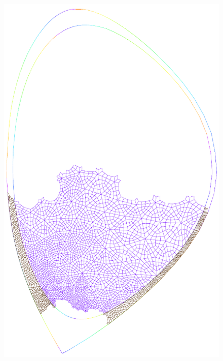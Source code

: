 \begin{figure}
{\includegraphics[scale=.5]{images/tokamak_layer_mesh_adapt_fine_2_par.pdf}}\quad
\subfigure[{rank = 3}\label{fig:tokamak_layer_mesh_adapt_fine_3_par}]

\end{figure}

